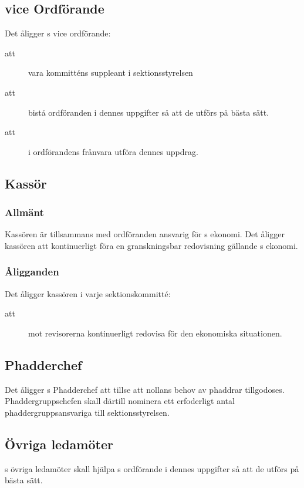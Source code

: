 \subsection{vice Ordförande}
Det åligger \forening s vice ordförande:
\begin{description}

\item[att] vara kommitténs suppleant i sektionsstyrelsen

\item[att] bistå ordföranden i dennes uppgifter så att de utförs på bästa sätt.
\item[att] i ordförandens frånvara utföra dennes uppdrag.

\end{description}



\subsection{Kassör}
\subsubsection{Allmänt}
Kassören är tillsammans med ordföranden ansvarig för \forening s ekonomi. Det åligger kassören att kontinuerligt föra en granskningsbar redovisning gällande \forening s ekonomi.

\subsubsection{Åligganden}
Det åligger kassören i varje sektionskommitté:
\begin{description}
\item[att] mot revisorerna kontinuerligt redovisa för den ekonomiska situationen.

\end{description}

\subsection{Phadderchef}
Det åligger \forening s Phadderchef att tillse att nollans behov av phaddrar tillgodoses.\\
Phaddergruppschefen skall därtill nominera ett erfoderligt antal phaddergruppsansvariga till sektionsstyrelsen.


\subsection{Övriga ledamöter}
\forening s övriga ledamöter skall hjälpa \forening s ordförande i dennes uppgifter så att de utförs på bästa sätt.

